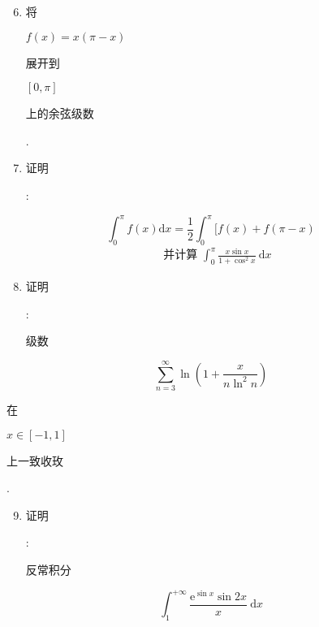 \documentclass[10pt]{article}
\begin{document}
\begin{enumerate}
  \setcounter{enumi}{5}
  \item \begin{CJK}{UTF8}{mj}将\end{CJK} $f(x)=x(\pi-x)$ \begin{CJK}{UTF8}{mj}展开到\end{CJK} $[0, \pi]$ \begin{CJK}{UTF8}{mj}上的余弦级数\end{CJK}.

  \item \begin{CJK}{UTF8}{mj}证明\end{CJK}:

\end{enumerate}
$$
\int_{0}^{\pi} f(x) \mathrm{d} x=\frac{1}{2} \int_{0}^{\pi}[f(x)+f(\pi-x)
$$
$$
\begin{aligned}
& \text { 并计算 } \int_{0}^{\pi} \frac{x \sin x}{1+\cos ^{2} x} \mathrm{~d} x
\end{aligned}
$$

\begin{enumerate}
  \setcounter{enumi}{7}
  \item \begin{CJK}{UTF8}{mj}证明\end{CJK}: \begin{CJK}{UTF8}{mj}级数\end{CJK}
\end{enumerate}
$$
\sum_{n=3}^{\infty} \ln \left(1+\frac{x}{n \ln ^{2} n}\right)
$$
\begin{CJK}{UTF8}{mj}在\end{CJK} $x \in[-1,1]$ \begin{CJK}{UTF8}{mj}上一致收玫\end{CJK}.

\begin{enumerate}
  \setcounter{enumi}{8}
  \item \begin{CJK}{UTF8}{mj}证明\end{CJK}: \begin{CJK}{UTF8}{mj}反常积分\end{CJK}
\end{enumerate}
$$
\int_{1}^{+\infty} \frac{\mathrm{e}^{\sin x} \sin 2 x}{x} \mathrm{~d} x
$$
\end{document}
